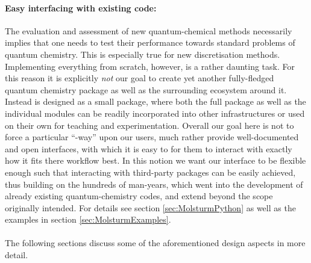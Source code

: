 \paragraph{Easy interfacing with existing code:}
The evaluation and assessment of new quantum-chemical methods
necessarily implies that one needs to test their performance
towards standard problems of quantum chemistry.
This is especially true for new discretisation methods.
Implementing everything from scratch,
however, is a rather daunting task.
For this reason it is explicitly \emph{not} our goal
to create yet another fully-fledged quantum chemistry package
as well as the surrounding ecosystem around it.
Instead \molsturm is designed as a small package,
where both the full package as well as the individual modules
can be readily incorporated into other infrastructures
or used on their own for teaching and experimentation.
Overall our goal here is not to force a particular ``\molsturm-way'' upon
our users,
much rather provide well-documented and open interfaces,
with which it is easy to for them to interact with \molsturm
exactly how it fits there workflow best.
In this notion we want our \molsturm interface
to be flexible enough such that interacting
with third-party packages can be easily achieved,
thus building on the hundreds of man-years,
which went into the development of already existing quantum-chemistry codes,
and extend \molsturm beyond the scope originally intended.
For details see section \vref{sec:MolsturmPython}
as well as the examples in section \vref{sec:MolsturmExamples}.
%
%
\paragraph*{}
The following sections discuss some of the
aforementioned design aspects in more detail.

